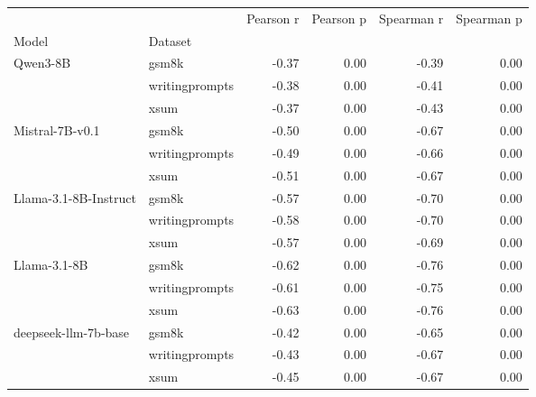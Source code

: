 \begin{tabular}{llrrrr}
\toprule
 &  & Pearson r & Pearson p & Spearman r & Spearman p \\
Model & Dataset &  &  &  &  \\
\midrule
\multirow[t]{3}{*}{Qwen3-8B} & gsm8k & -0.37 & 0.00 & -0.39 & 0.00 \\
 & writingprompts & -0.38 & 0.00 & -0.41 & 0.00 \\
 & xsum & -0.37 & 0.00 & -0.43 & 0.00 \\
\cline{1-6}
\multirow[t]{3}{*}{Mistral-7B-v0.1} & gsm8k & -0.50 & 0.00 & -0.67 & 0.00 \\
 & writingprompts & -0.49 & 0.00 & -0.66 & 0.00 \\
 & xsum & -0.51 & 0.00 & -0.67 & 0.00 \\
\cline{1-6}
\multirow[t]{3}{*}{Llama-3.1-8B-Instruct} & gsm8k & -0.57 & 0.00 & -0.70 & 0.00 \\
 & writingprompts & -0.58 & 0.00 & -0.70 & 0.00 \\
 & xsum & -0.57 & 0.00 & -0.69 & 0.00 \\
\cline{1-6}
\multirow[t]{3}{*}{Llama-3.1-8B} & gsm8k & -0.62 & 0.00 & -0.76 & 0.00 \\
 & writingprompts & -0.61 & 0.00 & -0.75 & 0.00 \\
 & xsum & -0.63 & 0.00 & -0.76 & 0.00 \\
\cline{1-6}
\multirow[t]{3}{*}{deepseek-llm-7b-base} & gsm8k & -0.42 & 0.00 & -0.65 & 0.00 \\
 & writingprompts & -0.43 & 0.00 & -0.67 & 0.00 \\
 & xsum & -0.45 & 0.00 & -0.67 & 0.00 \\
\cline{1-6}
\bottomrule
\end{tabular}
